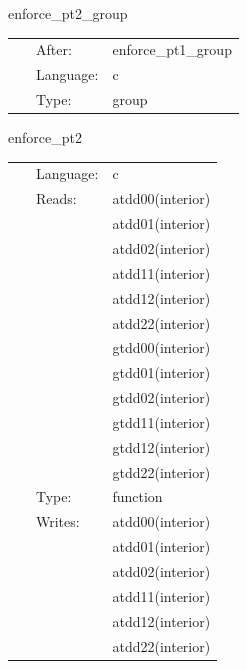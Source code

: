 \documentclass{article}
\begin{document}
\vspace{5mm}


\hspace{5mm} enforce\_pt2\_group 

\hspace{5mm}{\it group for function `enforce\_pt2`. generated by einsteinengine. } 


\hspace{5mm}

 \begin{tabular*}{160mm}{cll} 
~ & After:  & enforce\_pt1\_group \\ 
~ & Language:  & c \\ 
~ & Type:  & group \\ 
\end{tabular*} 


\vspace{5mm}


\hspace{5mm} enforce\_pt2 

\hspace{5mm}{\it function `enforce\_pt2` generated by einsteinengine. } 


\hspace{5mm}

 \begin{tabular*}{160mm}{cll} 
~ & Language:  & c \\ 
~ & Reads:  & atdd00(interior) \\ 
~& ~ &atdd01(interior)\\ 
~& ~ &atdd02(interior)\\ 
~& ~ &atdd11(interior)\\ 
~& ~ &atdd12(interior)\\ 
~& ~ &atdd22(interior)\\ 
~& ~ &gtdd00(interior)\\ 
~& ~ &gtdd01(interior)\\ 
~& ~ &gtdd02(interior)\\ 
~& ~ &gtdd11(interior)\\ 
~& ~ &gtdd12(interior)\\ 
~& ~ &gtdd22(interior)\\ 
~ & Type:  & function \\ 
~ & Writes:  & atdd00(interior) \\ 
~& ~ &atdd01(interior)\\ 
~& ~ &atdd02(interior)\\ 
~& ~ &atdd11(interior)\\ 
~& ~ &atdd12(interior)\\ 
~& ~ &atdd22(interior)\\ 
\end{tabular*} 
\end{document}
